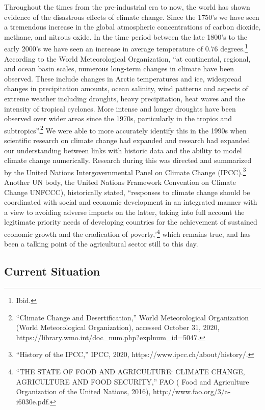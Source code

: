 \documentclass[10pt, letterpaper]{article}
\begin{document}
Throughout the times from the pre-industrial era to now, the world has
shown evidence of the disastrous effects of climate change. Since the
1750's we have seen a tremendous increase in the global atmospheric
concentrations of carbon dioxide, methane, and nitrous oxide. In the
time period between the late 1800's to the early 2000's we have seen an
increase in average temperature of 0.76 degrees.\footnote{Ibid.}
According to the World Meteorological Organization, ``at continental,
regional, and ocean basin scales, numerous long-term changes in climate
have been observed. These include changes in Arctic temperatures and
ice, widespread changes in precipitation amounts, ocean salinity, wind
patterns and aspects of extreme weather including droughts, heavy
precipitation, heat waves and the intensity of tropical cyclones. More
intense and longer droughts have been observed over wider areas since
the 1970s, particularly in the tropics and subtropics''.\footnote{``Climate
  Change and Desertification,'' World Meteorological Organization (World
  Meteorological Organization), accessed October 31, 2020,
  https://library.wmo.int/doc\_num.php?explnum\_id=5047.} We were able
to more accurately identify this in the 1990s when scientific research
on climate change had expanded and research had expanded our
understanding between links with historic data and the ability to model
climate change numerically. Research during this was directed and
summarized by the United Nations Intergovernmental Panel on Climate
Change (IPCC).\footnote{``History of the IPCC,'' IPCC, 2020,
  https://www.ipcc.ch/about/history/.} \\

Another UN body, the United Nations Framework Convention on Climate
Change UNFCCC), historically stated, ``responses to climate change
should be coordinated with social and economic development in an
integrated manner with a view to avoiding adverse impacts on the latter,
taking into full account the legitimate priority needs of developing
countries for the achievement of sustained economic growth and the
eradication of poverty,'\footnote{``THE STATE OF FOOD AND AGRICULTURE:
  CLIMATE CHANGE, AGRICULTURE AND FOOD SECURITY,'' FAO ( Food and
  Agriculture Organization of the United Nations, 2016),
  http://www.fao.org/3/a-i6030e.pdf.} which remains true, and has been a
talking point of the agricultural sector still to this day. \\

\subsection{Current Situation}
\end{document}
